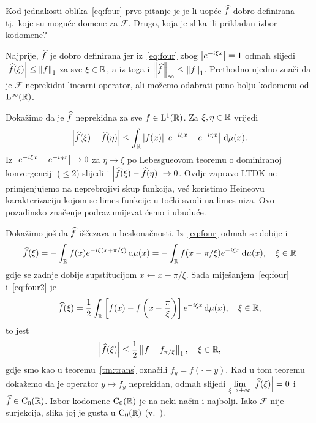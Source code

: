 \documentclass[main.tex]{subfiles}
\begin{document}
\begin{komentar}\label{kom:four2}
	Kod jednakosti oblika~\eqref{eq:four} prvo pitanje
	je je li uopće \( \widehat{f} \) dobro definirana tj.\ koje su moguće domene
	za \( \mathcal F \). Drugo, koja je slika ili prikladan izbor kodomene?

	Najprije, \( \widehat{f} \) je dobro definirana jer iz~\eqref{eq:four}
	zbog \( \left| {e^{-i\xi x}} \right| = 1 \) odmah slijedi
	\( \left| {\widehat{f}(\xi)} \right| \le \left\lVert f\right\rVert_1 \) za sve \( \xi \in \mathbb{R} \),
	a iz toga i \( \left\lVert\widehat{f}\right\rVert_\infty \le \left\lVert f\right\rVert_1 \).
	Prethodno ujedno znači da je \( \mathcal F \) neprekidni linearni operator,
	ali možemo odabrati puno bolju kodomenu od \( \mathrm{L}^\infty(\mathbb{R}) \).

	Dokažimo da je \( \widehat{f} \) neprekidna za sve \( f \in \mathrm{L}^1(\mathbb{R}) \).
	Za \( \xi, \eta \in \mathbb{R} \) vrijedi
	\begin{equation}
		\left| {\widehat{f}(\xi) - \widehat{f}(\eta)} \right|
		\le \int_{\mathbb{R}} \left| {f(x)} \right|\left| {e^{-i\xi x} - e^{-i\eta x}} \right| \,\mathrm d \mu(x).
	\end{equation}
	Iz \( \left| {e^{-i\xi x} - e^{-i\eta x}} \right| \rightarrow 0 \) za \( \eta \rightarrow \xi \)
	po Lebesgueovom teoremu o dominiranoj konvergenciji (\( \le 2 \))
	slijedi i \( \left| {\widehat{f}(\xi) - \widehat{f}(\eta)} \right| \rightarrow 0 \).
	Ovdje zapravo LTDK ne primjenjujemo na neprebrojivi skup funkcija,
	već koristimo Heineovu karakterizaciju kojom se limes funkcije u točki
	svodi na limes niza. Ovo pozadinsko značenje podrazumijevat ćemo i ubuduće.

	Dokažimo još da \( \widehat{f} \) iščezava u beskonačnosti. Iz~\eqref{eq:four}
	odmah se dobije i
	\begin{equation}\label{eq:four2}
		\widehat{f} (\xi) = -\int_{\mathbb{R}} f(x) e^{-i\xi(x + \pi/\xi)} \,\mathrm d \mu(x)
		= -\int_{\mathbb{R}} f(x-\pi/\xi) e^{-i\xi x} \,\mathrm d \mu(x), \quad \xi \in \mathbb{R}
	\end{equation}
	gdje se zadnje dobije supstitucijom \( x \leftarrow x - \pi/\xi \). Sada
	miješanjem~\eqref{eq:four} i~\eqref{eq:four2}
	je
	\begin{equation}
		\widehat{f}(\xi) = \frac 12 \int_{\mathbb{R}} \left[ f(x)-f\left( x-\frac \pi \xi \right) \right] e^{-i\xi x} \,\mathrm d \mu(x), \quad \xi \in \mathbb{R},
	\end{equation}
	to jest
	\begin{equation}
		\left| {\widehat{f} (\xi)} \right| \le \frac 12 \left\lVert f - f_{\pi/\xi}\right\rVert_1, \quad \xi \in \mathbb{R},
	\end{equation}
	gdje smo kao u teoremu~\ref{tm:trans} označili
	\( f_{y} = f(\cdot - y) \). Kad u tom teoremu dokažemo
	da je operator \( y \mapsto f_y \) neprekidan, odmah slijedi
	\( \lim\limits_{\xi \rightarrow \pm \infty} \left| {\widehat{f} (\xi)} \right| = 0 \)
	i \( \widehat{f} \in \mathrm C_0(\mathbb{R}) \). Izbor kodomene
	\( \mathrm C_0(\mathbb{R}) \) je na neki način i najbolji. Iako
	\( \mathcal F \) nije surjekcija, slika joj je gusta u
	\( \mathrm C_0(\mathbb{R}) \) (v.~\cite[exercise~9.2]{rudin}).
\end{komentar}
\end{document}
